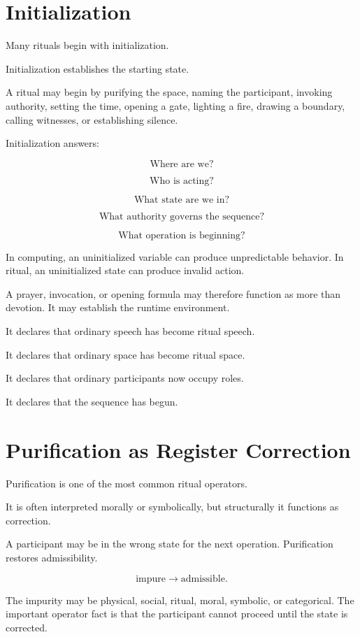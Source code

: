 \documentclass[11pt]{book}
\begin{document}
\section{Initialization}

Many rituals begin with initialization.

Initialization establishes the starting state.

A ritual may begin by purifying the space, naming the participant, invoking authority, setting the time, opening a gate, lighting a fire, drawing a boundary, calling witnesses, or establishing silence.

Initialization answers:

\[
\text{Where are we?}
\]

\[
\text{Who is acting?}
\]

\[
\text{What state are we in?}
\]

\[
\text{What authority governs the sequence?}
\]

\[
\text{What operation is beginning?}
\]

In computing, an uninitialized variable can produce unpredictable behavior. In ritual, an uninitialized state can produce invalid action.

A prayer, invocation, or opening formula may therefore function as more than devotion. It may establish the runtime environment.

It declares that ordinary speech has become ritual speech.

It declares that ordinary space has become ritual space.

It declares that ordinary participants now occupy roles.

It declares that the sequence has begun.

\section{Purification as Register Correction}

Purification is one of the most common ritual operators.

It is often interpreted morally or symbolically, but structurally it functions as correction.

A participant may be in the wrong state for the next operation. Purification restores admissibility.

\[
\text{impure} \rightarrow \text{admissible}.
\]

The impurity may be physical, social, ritual, moral, symbolic, or categorical. The important operator fact is that the participant cannot proceed until the state is corrected.
\end{document}
